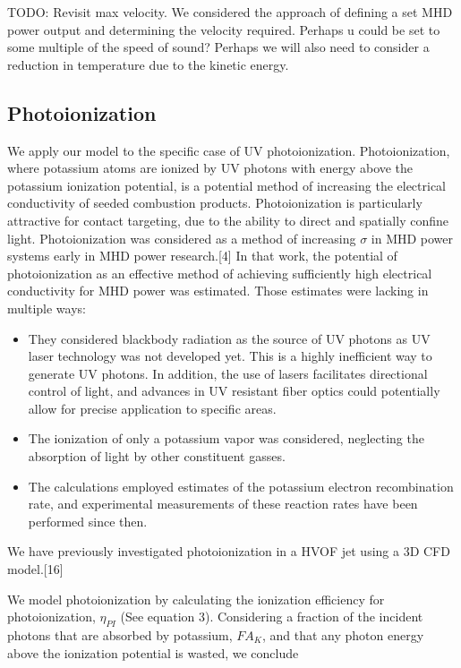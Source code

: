 TODO: Revisit max velocity. We considered the approach of defining a set MHD power output and determining the velocity required. Perhaps u could be set to some multiple of the speed of sound? Perhaps we will also need to consider a reduction in temperature due to the kinetic energy.

\hypertarget{photoionization}{%
\subsection{Photoionization}\label{photoionization}}

We apply our model to the specific case of UV photoionization. Photoionization, where potassium atoms are ionized by UV photons with energy above the potassium ionization potential, is a potential method of increasing the electrical conductivity of seeded combustion products. Photoionization is particularly attractive for contact targeting, due to the ability to direct and spatially confine light. Photoionization was considered as a method of increasing \(\sigma\) in MHD power systems early in MHD power research.{[}4{]} In that work, the potential of photoionization as an effective method of achieving sufficiently high electrical conductivity for MHD power was estimated. Those estimates were lacking in multiple ways:

\begin{itemize}
\item
  They considered blackbody radiation as the source of UV photons as UV laser technology was not developed yet. This is a highly inefficient way to generate UV photons. In addition, the use of lasers facilitates directional control of light, and advances in UV resistant fiber optics could potentially allow for precise application to specific areas.
\item
  The ionization of only a potassium vapor was considered, neglecting the absorption of light by other constituent gasses.
\item
  The calculations employed estimates of the potassium electron recombination rate, and experimental measurements of these reaction rates have been performed since then.
\end{itemize}

We have previously investigated photoionization in a HVOF jet using a 3D CFD model.{[}16{]}

We model photoionization by calculating the ionization efficiency for photoionization, \(\eta_{PI}\) (See equation 3). Considering a fraction of the incident photons that are absorbed by potassium, \(FA_{K}\), and that any photon energy above the ionization potential is wasted, we conclude

